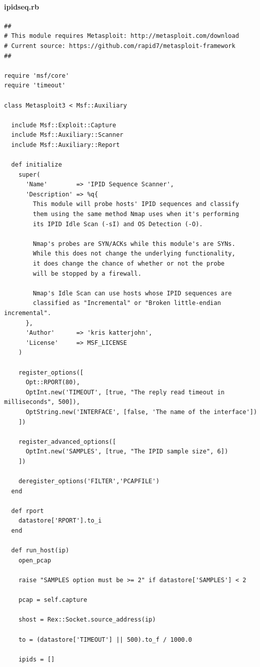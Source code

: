 \documentclass[10pt,a4paper]{article}
\begin{document}
\paragraph{ipidseq.rb}
\begin{lstlisting}
##
# This module requires Metasploit: http://metasploit.com/download
# Current source: https://github.com/rapid7/metasploit-framework
##

require 'msf/core'
require 'timeout'

class Metasploit3 < Msf::Auxiliary

  include Msf::Exploit::Capture
  include Msf::Auxiliary::Scanner
  include Msf::Auxiliary::Report

  def initialize
    super(
      'Name'        => 'IPID Sequence Scanner',
      'Description' => %q{
        This module will probe hosts' IPID sequences and classify
        them using the same method Nmap uses when it's performing
        its IPID Idle Scan (-sI) and OS Detection (-O).

        Nmap's probes are SYN/ACKs while this module's are SYNs.
        While this does not change the underlying functionality,
        it does change the chance of whether or not the probe
        will be stopped by a firewall.

        Nmap's Idle Scan can use hosts whose IPID sequences are
        classified as "Incremental" or "Broken little-endian incremental".
      },
      'Author'      => 'kris katterjohn',
      'License'     => MSF_LICENSE
    )

    register_options([
      Opt::RPORT(80),
      OptInt.new('TIMEOUT', [true, "The reply read timeout in milliseconds", 500]),
      OptString.new('INTERFACE', [false, 'The name of the interface'])
    ])

    register_advanced_options([
      OptInt.new('SAMPLES', [true, "The IPID sample size", 6])
    ])

    deregister_options('FILTER','PCAPFILE')
  end

  def rport
    datastore['RPORT'].to_i
  end

  def run_host(ip)
    open_pcap

    raise "SAMPLES option must be >= 2" if datastore['SAMPLES'] < 2

    pcap = self.capture

    shost = Rex::Socket.source_address(ip)

    to = (datastore['TIMEOUT'] || 500).to_f / 1000.0

    ipids = []


\end{lstlisting}
\end{document}
